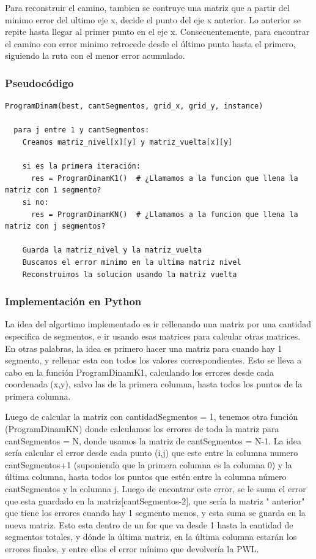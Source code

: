 \documentclass{article}
\begin{document}
        
        Para reconstruir el camino, tambien se contruye una matriz que a partir del minimo error del ultimo eje x, decide el punto del eje x anterior. Lo anterior se repite hasta llegar al primer punto en el eje x. Consecuentemente, para encontrar el camino con error minimo retrocede desde el último punto hasta el primero, siguiendo la ruta con el menor error acumulado.


\subsubsection{Pseudocódigo}
        

        \begin{lstlisting}[language=pseudocode]
ProgramDinam(best, cantSegmentos, grid_x, grid_y, instance)

  para j entre 1 y cantSegmentos:
    Creamos matriz_nivel[x][y] y matriz_vuelta[x][y]

    si es la primera iteración:
      res = ProgramDinamK1()  # ¿Llamamos a la funcion que llena la matriz con 1 segmento?
    si no:
      res = ProgramDinamKN()  # ¿Llamamos a la funcion que llena la matriz con j segmentos?

    Guarda la matriz_nivel y la matriz_vuelta
    Buscamos el error minimo en la ultima matriz nivel
    Reconstruimos la solucion usando la matriz vuelta
\end{lstlisting}

        
         
\subsubsection{Implementación en Python}
            La idea del algortimo implementado es ir rellenando una matriz por una cantidad especifica de segmentos, e ir usando esas matrices para calcular otras matrices. En otras palabras, la idea es primero hacer una matriz para cuando hay 1 segmento, y rellenar esta con todos los valores correspondientes. Esto se lleva a cabo en la función ProgramDinamK1, calculando los errores desde cada coordenada (x,y), salvo las de la primera columna, hasta todos los puntos de la primera columna.
            
            Luego de calcular la matriz con cantidadSegmentos = 1, tenemos otra función (ProgramDinamKN) donde calculamos los errores de toda la matriz para cantSegmentos = N, donde usamos la matriz de cantSegmentos = N-1. La idea sería calcular el error desde cada punto (i,j) que este entre la columna numero cantSegmentos+1 (suponiendo que la primera columna es la columna 0) y la última columna, hasta todos los puntos que estén entre la columna número cantSegmentos y la columna j. Luego de encontrar este error, se le suma el error que esta guardado en la matriz[cantSegmentos-2], que sería la matriz " anterior" que tiene los errores cuando hay 1 segmento menos, y esta suma se guarda en la nueva matriz. Esto esta dentro de un for que va desde 1 hasta la cantidad de segmentos totales, y dónde la última matriz, en la última columna estarán los errores finales, y entre ellos el error mínimo que devolvería la PWL.
\end{document}

